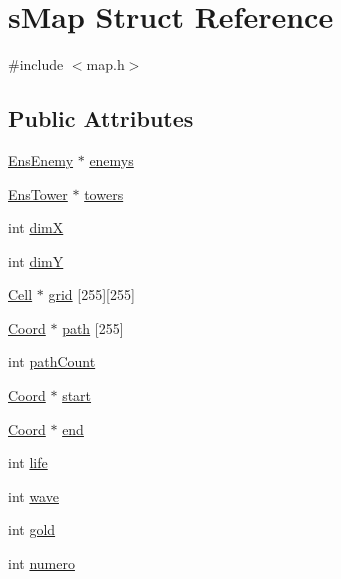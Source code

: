 \hypertarget{structs_map}{\section{s\-Map Struct Reference}
\label{structs_map}
}


{\ttfamily \#include $<$map.\-h$>$}

\subsection*{Public Attributes}
\begin{DoxyCompactItemize}
\item 
\hyperlink{ens_enemy_8h_a26a6c5620b5248c6be80e179219bd489}{Ens\-Enemy} $\ast$ \hyperlink{structs_map_a7319b51da24fb022fa90806e9cd7bd76}{enemys}
\item 
\hyperlink{ens_tower_8h_a24777732150ac32528df3ba02a20a836}{Ens\-Tower} $\ast$ \hyperlink{structs_map_a93cab5b7e4f3205c43335147e2a3f066}{towers}
\item 
int \hyperlink{structs_map_a9ba71dc7a7b6eeb28048a66493c620d4}{dim\-X}
\item 
int \hyperlink{structs_map_a3f0d31fe9f43386379f2eece819cad01}{dim\-Y}
\item 
\hyperlink{map_8h_ae6d03ecef1dc8e54c2395164d3978fe5}{Cell} $\ast$ \hyperlink{structs_map_a5c09c94b17e9241ec28aba0407808aff}{grid} \mbox{[}255\mbox{]}\mbox{[}255\mbox{]}
\item 
\hyperlink{coordonates_8h_aff9d4468ac7a973ce7e5cfb5bd39bc33}{Coord} $\ast$ \hyperlink{structs_map_a7b410c58024a707229d3c7ec832bdf27}{path} \mbox{[}255\mbox{]}
\item 
int \hyperlink{structs_map_a1d8b95b78adb7ddb2381de089e870991}{path\-Count}
\item 
\hyperlink{coordonates_8h_aff9d4468ac7a973ce7e5cfb5bd39bc33}{Coord} $\ast$ \hyperlink{structs_map_aa50747972cf5e8c17c9927eb8b0439c7}{start}
\item 
\hyperlink{coordonates_8h_aff9d4468ac7a973ce7e5cfb5bd39bc33}{Coord} $\ast$ \hyperlink{structs_map_af32a1725ce537428fb1927a1fbb967fd}{end}
\item 
int \hyperlink{structs_map_a7ac656eb61c1fd86f15eb6a36df144e8}{life}
\item 
int \hyperlink{structs_map_abe7b6a265689239f6a6ffbcfd95508be}{wave}
\item 
int \hyperlink{structs_map_a2751a189d93f2aead4161dab37878ff2}{gold}
\item 
int \hyperlink{structs_map_a87168578fa698ab88b296e3d113d8af2}{numero}
\end{DoxyCompactItemize}


